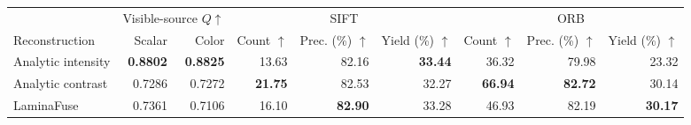 \begin{tabular}{lrrrrrrrr}
\toprule
& \multicolumn{2}{c}{Visible-source $Q\uparrow$} & \multicolumn{3}{c}{SIFT} & \multicolumn{3}{c}{ORB}\\
\cmidrule(lr){2-3}\cmidrule(lr){4-6}\cmidrule(lr){7-9}
Reconstruction & Scalar & Color & Count $\uparrow$ & Prec. (\%) $\uparrow$ & Yield (\%) $\uparrow$ & Count $\uparrow$ & Prec. (\%) $\uparrow$ & Yield (\%) $\uparrow$\\
\midrule
Analytic intensity & \textbf{0.8802} & \textbf{0.8825} & 13.63 & 82.16 & \textbf{33.44} & 36.32 & 79.98 & 23.32\\
Analytic contrast & 0.7286 & 0.7272 & \textbf{21.75} & 82.53 & 32.27 & \textbf{66.94} & \textbf{82.72} & 30.14\\
LaminaFuse & 0.7361 & 0.7106 & 16.10 & \textbf{82.90} & 33.28 & 46.93 & 82.19 & \textbf{30.17}\\
\bottomrule
\end{tabular}
